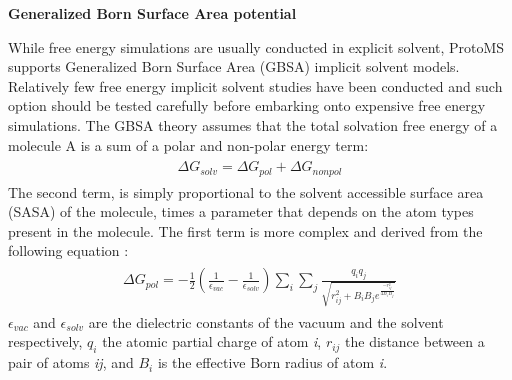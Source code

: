 \documentclass[letterpaper,10pt,english]{sphinxmanual}
\begin{document}
\textbf{Generalized Born Surface Area potential}

While free energy simulations are usually conducted in explicit solvent, ProtoMS supports Generalized Born Surface Area (GBSA) implicit solvent models. Relatively few free energy implicit solvent studies have been conducted and such option should be tested carefully before embarking onto expensive free energy simulations. The GBSA theory assumes that the total solvation free energy of a molecule A is a sum of a polar and non-polar energy term:
\label{protoms:equation-gb1}\begin{gather}
\begin{split}\Delta G_{solv} = \Delta G_{pol} + \Delta G_{nonpol}\end{split}\label{protoms-gb1}
\end{gather}
The second term, is simply proportional to the solvent accessible surface area (SASA) of the molecule, times a parameter that depends on the atom types present in the molecule. The first term is more complex and derived from the following equation :
\label{protoms:equation-gb2}\begin{gather}
\begin{split}\Delta G_{pol} = -\frac{1}{2}(\frac{1}{\epsilon_{vac}}-\frac{1}{\epsilon_{solv}})  \sum_{i}\sum_{j} \frac{q_{i}q_{j}}{\sqrt{r^{2}_{ij} + B_{i}B_{j} e^{\frac{-r^{2}_{ij}}{4B_{i}B_{j}}}   } }\end{split}\label{protoms-gb2}
\end{gather}
\(\epsilon_{vac}\) and \(\epsilon_{solv}\) are the dielectric constants of the vacuum and the solvent respectively, \(q_{i}\) the atomic partial charge of atom \emph{i}, \(r_{ij}\) the distance between a pair of atoms \emph{ij}, and \(B_{i}\) is the effective Born radius of atom \emph{i}.
\end{document}

